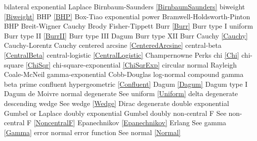 bilateral exponential  			\dotfill	Laplace 							\ncite	%
Birnbaum-Saunders				\dotfill	\eqref{BirnbaumSaunders}			\ncite
biweight						\dotfill	\eqref{Biweight}					\ncite
BHP								\dotfill	\eqref{BHP}							\ncite	%
Box-Tiao						\dotfill	exponential power					\ncite
Bramwell-Holdsworth-Pinton 		\dotfill	BHP 								\ncite	%
Breit-Wigner  					\dotfill	Cauchy 								\ncite	%
Brody							\dotfill	Fisher-Tippett						\ncite	%
Burr							\dotfill	\eqref{Burr} 						\ncite	%
Burr type I						\dotfill	uniform 							\ncite	%
Burr type II					\dotfill	\eqref{BurrII} 						\ncite	%
Burr type III					\dotfill	Dagum								\ncite	%
Burr type XII					\dotfill	Burr 								\ncite	%
%
Cauchy	 						\dotfill	\eqref{Cauchy} 							%
Cauchy-Lorentz 					\dotfill	Cauchy 								\ncite	%
centered arcsine 				\dotfill	\eqref{CenteredArcsine} 			\ncite	%
central-beta 					\dotfill	\eqref{CentralBeta}					\mcite{\self}
central-logistic 				\dotfill	\eqref{CentralLogistic}				\mcite{\self}
Champernowne					\dotfill	Perks								\ncite
chi								\dotfill	\eqref{Chi}							\ncite	%
chi-square						\dotfill	\eqref{ChiSqr}						\ncite	%
chi-square-exponential			\dotfill	\eqref{ChiSqrExp}					\mcite{\self}	%
circular normal					\dotfill	Rayleigh							\ncite %
Coale-McNeil 					\dotfill	gamma-exponential 					     %
Cobb-Douglas					\dotfill	log-normal 							\ncite	%
compound gamma					\dotfill	beta prime								%
confluent hypergeometric 		\dotfill	\eqref{Confluent}					\ncite
%
Dagum 							\dotfill	\eqref{Dagum} 						\ncite	%
Dagum type I 					\dotfill	Dagum								\ncite	%
de Moivre						\dotfill	normal 								\ncite	%
degenerate						\dotfill	See uniform \eqref{Uniform} 		\ncite	%
delta  							\dotfill	degenerate  						\ncite 	%
descending wedge				\dotfill	See wedge \eqref{Wedge} 			\ncite	%
Dirac							\dotfill	degenerate							\ncite	
double exponential 				\dotfill	Gumbel or Laplace 					\ncite	%
doubly exponential				\dotfill	Gumbel								\ncite	%
doubly non-central F       		\dotfill	See non-central F  					\eqref{NoncentralF} 	\ncite 
%
Epanechnikov					\dotfill	\eqref{Epanechnikov}				\ncite
Erlang							\dotfill	See gamma \eqref{Gamma} 			\ncite 	%
error 							\dotfill	normal 								\ncite	%
error function					\dotfill	See normal \eqref{Normal}			\ncite	%

